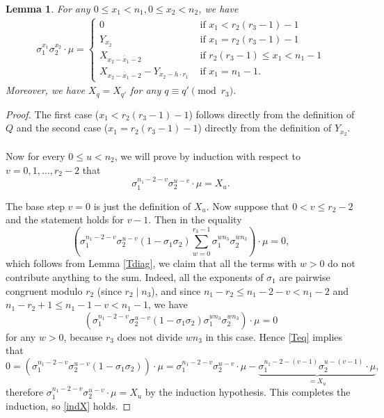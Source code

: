 \documentclass[12pt,a4paper]{article}
\newtheorem{lemma}[theorem]{Lemma}
\theoremstyle{definition}
\begin{document}
\begin{lemma}\label{XY}
For any $0\leq x_1<n_1, 0\leq x_2<n_2$, we have
\begin{align*}
\sigma_1^{x_1}\sigma_2^{x_2}\cdot \mu=
\begin{cases}
0   &\text{ if }  x_1<r_2(r_3-1)-1\\
Y_{x_2} \quad &\text{ if } x_1=r_2(r_3-1)-1 \\
X_{\overline{x_2-x_1-2}}  \quad &\text{ if } r_2(r_3-1)\leq x_1<n_1-1 \\
X_{\overline{x_2-x_1-2}}-Y_{x_2-h\cdot r_1} &\text{ if }  x_1=n_1-1.
\end{cases}
\end{align*}
Moreover, we have $X_q=X_{q'}$ for any $q\equiv q'\pmod {r_3}$.
\end{lemma}
\begin{proof}

The first case ($x_1<r_2(r_3-1)-1$) follows directly from the definition of $Q$ and the second case ($x_1=r_2(r_3-1)-1$) directly from the definition of $Y_{x_2}$.

\paragraph*{}
Now for every $0\leq u <n_2$, we will prove by induction with respect to $v=0,1,\dots,r_2-2$ that 
\begin{equation}\label{indX}
\sigma_1^{n_1-2-v}\sigma_2^{u-v}\cdot \mu =X_u.
\end{equation}

The base step $v=0$ is just the definition of $X_u$. Now suppose that $0<v\leq r_2-2$ and the statement holds for $v-1$. Then in the equality
\begin{equation}\label{Teq}
\left(\sigma_1^{n_1-2-v}\sigma_2^{u-v}(1-\sigma_1\sigma_2)\sum_{w=0}^{r_3-1}\sigma_1^{wn_3}\sigma_2^{wn_3}\right)\cdot \mu=0,
\end{equation}
which follows from Lemma \ref{Tdiag}, we claim that all the terms with $w>0$ do not contribute anything to the sum. Indeed, all the exponents of $\sigma_1$ are pairwise congruent modulo $r_2$ (since $r_2\mid n_3$), and since $n_1-r_2\leq n_1-2-v<n_1-2$ and $n_1-r_2+1\leq n_1-1-v<n_1-1$, we have $$\left(\sigma_1^{n_1-2-v}\sigma_2^{u-v}(1-\sigma_1\sigma_2)\sigma_1^{wn_3}\sigma_2^{wn_3}\right)\cdot \mu=0$$ for any $w>0$, because  $r_3$ does not divide $wn_3$ in this case. Hence \eqref{Teq} implies that
$$0=\left(\sigma_1^{n_1-2-v}\sigma_2^{u-v}(1-\sigma_1\sigma_2)\right)\cdot \mu=\sigma_1^{n_1-2-v}\sigma_2^{u-v}\cdot \mu-\underbrace{\sigma_1^{n_1-2-(v-1)}\sigma_2^{u-(v-1)}\cdot \mu}_{=X_u},$$
therefore $\sigma_1^{n_1-2-v}\sigma_2^{u-v}\cdot \mu=X_u$ by the induction hypothesis. This completes the induction, so \eqref{indX} holds. %


\end{proof}
\end{document}
